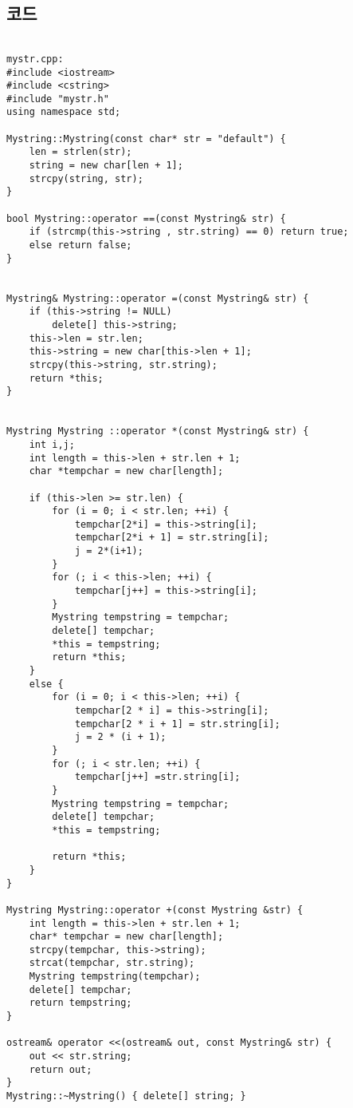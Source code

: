 \documentclass[a4paper]{article}
\begin{document}
\subsection{코드}
\begin{verbatim}

mystr.cpp:
#include <iostream>
#include <cstring>
#include "mystr.h"
using namespace std;

Mystring::Mystring(const char* str = "default") {
    len = strlen(str);
    string = new char[len + 1];
    strcpy(string, str);
}

bool Mystring::operator ==(const Mystring& str) {
    if (strcmp(this->string , str.string) == 0) return true;
    else return false;
}

 
Mystring& Mystring::operator =(const Mystring& str) {
    if (this->string != NULL)
        delete[] this->string;
    this->len = str.len;
    this->string = new char[this->len + 1];
    strcpy(this->string, str.string);
    return *this;
}

 
Mystring Mystring ::operator *(const Mystring& str) {
    int i,j;
    int length = this->len + str.len + 1;
    char *tempchar = new char[length];
  
    if (this->len >= str.len) {			 
        for (i = 0; i < str.len; ++i) {
            tempchar[2*i] = this->string[i];
            tempchar[2*i + 1] = str.string[i];
            j = 2*(i+1);
        }
        for (; i < this->len; ++i) {		 
            tempchar[j++] = this->string[i]; 
        }
        Mystring tempstring = tempchar;
        delete[] tempchar;			
        *this = tempstring;
        return *this;
    }
    else {
        for (i = 0; i < this->len; ++i) {
            tempchar[2 * i] = this->string[i];
            tempchar[2 * i + 1] = str.string[i];
            j = 2 * (i + 1);
        }
        for (; i < str.len; ++i) {
            tempchar[j++] =str.string[i];
        }
        Mystring tempstring = tempchar;
        delete[] tempchar;
        *this = tempstring;
        
        return *this;
    }
}
 
Mystring Mystring::operator +(const Mystring &str) {
    int length = this->len + str.len + 1;
    char* tempchar = new char[length];
    strcpy(tempchar, this->string);
    strcat(tempchar, str.string);
    Mystring tempstring(tempchar);
    delete[] tempchar;
    return tempstring;
}

ostream& operator <<(ostream& out, const Mystring& str) {
    out << str.string;
    return out;
}
Mystring::~Mystring() { delete[] string; }

\end{verbatim}
\end{document}
